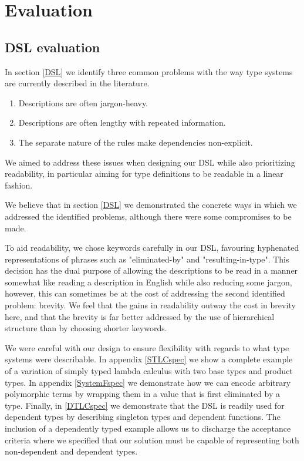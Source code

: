 \chapter{Evaluation}

\section{DSL evaluation}
\label{chapter-DSL-eval}

In section \ref{DSL} we identify three common problems with the way type
systems are currently described in the literature.

\begin{enumerate}
\item Descriptions are often jargon-heavy.
\item Descriptions are often lengthy with repeated information.
\item The separate nature of the rules make dependencies non-explicit.
\end{enumerate}

We aimed to address these issues when designing our DSL while also
prioritizing readability, in particular aiming for type definitions
to be readable in a linear fashion.

We believe that in section \ref{DSL} we demonstrated the concrete
ways in which we addressed the identified problems, although there
were some compromises to be made.

To aid readability, we chose keywords carefully in our
DSL, favouring hyphenated representations of phrases such as
"eliminated-by" and "resulting-in-type". This decision has the dual
purpose of allowing the descriptions to be read in a manner somewhat
like reading a description in English while also reducing some jargon,
however, this can sometimes be at the cost of addressing the second
identified problem: brevity. We feel that the gains in
readability outway the cost in brevity here, and that the brevity is
far better addressed by the use of hierarchical structure than by
choosing shorter keywords. 

We were careful with our design to ensure flexibility with regards to
what type systems were describable. In appendix \ref{STLCspec} we show
a complete example of a variation of simply typed lambda calculus with
two base types and product types. In appendix \ref{SystemFspec} we
demonstrate how we can encode arbitrary polymorphic terms by wrapping
them in a value that is first eliminated by a type. Finally, in
\ref{DTLCspec} we demonstrate that the DSL is readily used for
dependent types by describing singleton types and dependent
functions. The inclusion of a dependently typed example allows us to
discharge the acceptance criteria where we specified that our solution
must be capable of representing both non-dependent and dependent types.

